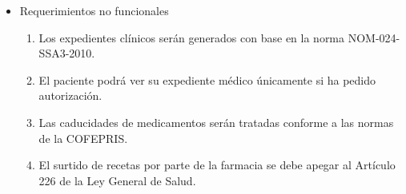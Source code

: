 \documentclass[12pt,letterpaper]{article}
\begin{document}
{{{\begin{itemize}
\begin{enumerate}
                        \item Los médicos podrán consultar la disponibilidad de medicamentos en farmacia.
                        \item El sistema generará una advertencia para los usuarios encargados de farmacia cuando un medicamento esté pronto a caducar.
                        \item Los médicos podrían generar recetas físicas o electrónicas.
                        \item Cada consulta se llevará un registro de el personal que atendió al paciente.
                    \end{enumerate}
                    \item Requerimientos no funcionales
                    \begin{enumerate}
                        \item Los expedientes clínicos serán generados con base en la norma NOM-024-SSA3-2010.
                        \item El paciente podrá ver su expediente médico únicamente si ha pedido autorización.
                        \item Las caducidades de medicamentos serán tratadas conforme a las normas de la COFEPRIS.
                        \item El surtido de recetas por parte de la farmacia se debe apegar al Artículo 226 de la Ley General de Salud.
                    \end{enumerate}
            \end{itemize}
			}
		}
	}
\end{document}
